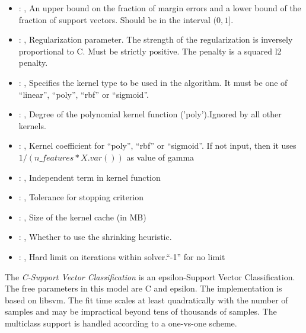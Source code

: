 \begin{itemize}
    \item {}: , 
      An upper bound on the fraction of margin errors and
      a lower bound of the fraction of support vectors. Should be in the interval $(0, 1]$.

    \item {}: , 
      Regularization parameter. The strength of the regularization is inversely
      proportional to C.                                                           Must be strictly
      positive. The penalty is a squared l2 penalty.

    \item {}: , 
      Specifies the kernel type to be used in the algorithm. It must be one of
      ``linear'', ``poly'', ``rbf'' or ``sigmoid''.

    \item {}: , 
      Degree of the polynomial kernel function ('poly').Ignored by all other kernels.

    \item {}: , 
      Kernel coefficient for ``poly'', ``rbf'' or ``sigmoid''. If not input, then it uses
      $1 / (n\_features * X.var())$ as value of gamma

    \item {}: , 
      Independent term in kernel function

    \item {}: , 
      Tolerance for stopping criterion

    \item {}: , 
      Size of the kernel cache (in MB)

    \item {}: , 
      Whether to use the shrinking heuristic.

    \item {}: , 
      Hard limit on iterations within solver.``-1'' for no limit
  \end{itemize}
 The  \textit{C-Support Vector Classification} is an epsilon-Support Vector
 Classification.                             The free parameters in this model are C and epsilon.
 The implementation is based on libsvm. The fit time scales at least
 quadratically with the number of samples and may be impractical                             beyond
 tens of thousands of samples. The multiclass support is handled according to a one-vs-one scheme.

